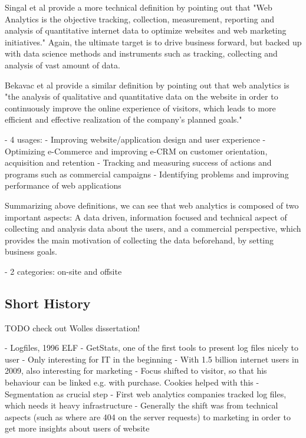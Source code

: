 Singal et al provide a more technical definition by pointing out that "Web Analytics is the objective tracking, collection, measurement, reporting and analysis of quantitative internet data to optimize websites and web marketing initiatives." %
Again, the ultimate target is to drive business forward, but backed up with data science methods and instruments such as tracking, collecting and analysis of vast amount of data.

Bekavac et al provide a similar definition by pointing out that web analytics is "the analysis of qualitative and quantitative data on the website in order to continuously improve the online experience of visitors, which leads to more efficient and effective realization of the company's planned goals." %

- 4 usages:
- Improving website/application design and user experience
- Optimizing e-Commerce and improving e-CRM on customer orientation, acquisition and retention
- Tracking and measuring success of actions and programs such as commercial campaigns
- Identifying problems and improving performance of web applications

Summarizing above definitions, we can see that web analytics is composed of two important aspects: A data driven, information focused and technical aspect of collecting and analysis data about the users, and a commercial perspective, which provides the main motivation of collecting the data beforehand, by setting business goals.


- 2 categories: on-site and offsite



\subsection{Short History}

TODO check out Wolles dissertation!

- Logfiles, 1996 ELF
- GetStats, one of the first tools to present log files nicely to user
- Only interesting for IT in the beginning
- With 1.5 billion internet users in 2009, also interesting for marketing
- Focus shifted to visitor, so that his behaviour can be linked e.g. with purchase.  Cookies helped with this
- Segmentation as crucial step
- First web analytics companies tracked log files, which needs it heavy infrastructure
- Generally the shift was from technical aspects (such as where are 404 on the server requests) to marketing in order to get more insights about users of website

